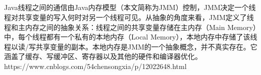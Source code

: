 \documentclass[../../../interview-questions.tex]{subfiles}
\begin{document}
\subsection{\color{red}{Java内存模型(Java Memory Model)}}

Java线程之间的通信由Java内存模型（本文简称为JMM）控制，JMM决定一个线程对共享变量的写入何时对另一个线程可见。从抽象的角度来看，JMM定义了线程和主内存之间的抽象关系：线程之间的共享变量存储在主内存（Main Memory）中，每个线程都有一个私有的本地内存（Local Memory），本地内存中存储了该线程以读/写共享变量的副本。本地内存是JMM的一个抽象概念，并不真实存在。它涵盖了缓存、写缓冲区、寄存器以及其他的硬件和编译器优化。https://www.cnblogs.com/54chensongxia/p/12022648.html
\end{document}
